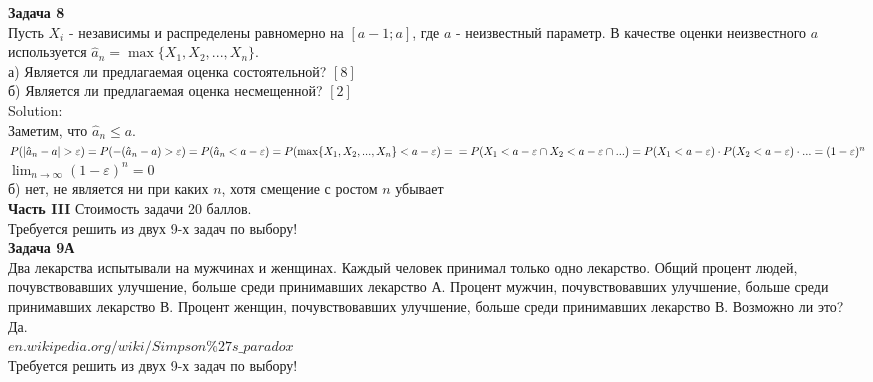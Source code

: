 \documentclass[pdftex,12pt,a4paper]{article}
\begin{document}
\textbf{Задача 8} \\ %
Пусть $X_{i}$ - независимы и распределены равномерно на $[a-1;a]$, где $a$ - неизвестный параметр. В качестве оценки неизвестного $a$ используется $\hat{a}_{n}=\max\{X_{1},X_{2},...,X_{n}\}$. \\
а) Является ли предлагаемая оценка состоятельной? $[8]$ \\
б) Является ли предлагаемая оценка несмещенной? $[2]$ \\
Solution: \\
Заметим, что $\hat{a}_{n}\leq a$. \\
$P(|\hat{a}_{n}-a|>\varepsilon)=P(-(\hat{a}_{n}-a)>\varepsilon)=P(\hat{a}_{n}<a-\varepsilon)=P(\max\{X_{1},X_{2},...,X_{n}\}<a-\varepsilon)= \\
=P(X_{1}<a-\varepsilon \cap X_{2}< a-\varepsilon\cap ...)=
P(X_{1}<a-\varepsilon)\cdot P(X_{2}<a-\varepsilon)\cdot ...=(1-\varepsilon)^{n}$ \\
$\lim_{n\to\infty} (1-\varepsilon)^{n} =0$ \\
б) нет, не является ни при каких $n$, хотя смещение с ростом $n$ убывает \\


\textbf{Часть III} Стоимость задачи 20 баллов. \\

Требуется решить \textbf{} из двух 9-х задач по
выбору! \\


\textbf{Задача 9А} \\
Два лекарства испытывали на мужчинах и женщинах. Каждый
человек принимал только одно лекарство. Общий процент людей,
почувствовавших улучшение, больше среди принимавших лекарство А.
Процент мужчин, почувствовавших улучшение, больше среди принимавших лекарство В. Процент женщин, почувствовавших улучшение, больше среди принимавших лекарство В. Возможно ли это? \\
Да. \\
$en.wikipedia.org/wiki/Simpson\%27s\_paradox$ \\

Требуется решить \textbf{} из двух 9-х задач по
выбору! \\
\end{document}
